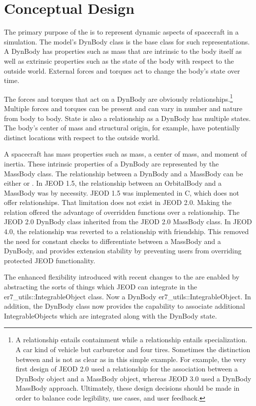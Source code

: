 \section{Conceptual Design}
The primary purpose of the \ModelDesc is to represent dynamic aspects of
spacecraft in a simulation.
The model's DynBody class is the base class for such representations.
A DynBody has properties such as mass that are intrinsic to the body itself
as well as extrinsic properties such as the state of the body with
respect to the outside world. External forces and torques act to change
the body's state over time.

The forces and torques that act on a DynBody are obviously \hasa
relationships.\footnote{A \hasa relationship entails containment while a \isa
relationship entails specialization. A car \isa kind of vehicle but \hasa carburetor and four tires. Sometimes the distinction between \isa and \hasa
is not as clear as in this simple example. For example, the very first design
of JEOD 2.0 used a \hasa relationship for the association between a DynBody
object and a MassBody object, whereas JEOD 3.0 used a DynBody \isa MassBody approach. Ultimately, these design decisions should be made in order to balance code legibility, use cases, and user feedback.}
Multiple forces and torques can be present and can vary in number
and nature from body to body.
State is also a \hasa relationship as a DynBody has multiple states.
The body's center of mass and structural origin, for example, have potentially
distinct locations with respect to the outside world.

A spacecraft has mass properties such as mass, a center of mass, and
moment of inertia.
These intrinsic properties of a DynBody are represented by the
 MassBody class. The relationship
between a DynBody and a MassBody can be either \hasa or \isa.
In JEOD 1.5, the relationship between an OrbitalBody
and a MassBody was \hasa by necessity. JEOD 1.5 was implemented in C,
which does not offer \isa relationships. That limitation does not
exist in JEOD 2.0. Making the relation \isa offered the advantage of overridden
functions over a \hasa relationship. The JEOD 2.0 DynBody class
inherited from the JEOD 2.0 MassBody class. In JEOD 4.0, the relationship was 
reverted to a \hasa relationship with friendship. This removed the need for 
constant checks to differentiate between a MassBody and a DynBody, and provides
 extension stability by preventing users from overriding protected JEOD 
 functionality.

The enhanced flexibility introduced with recent changes to
the  \INTEGRATION are enabled by abstracting the 
sorts of things which JEOD can integrate in the er7\_utils::IntegrableObject
class. Now a DynBody \isa er7\_utils::IntegrableObject.  In addition, the
DynBody class now provides the capability to associate additional
IntegrableObjects which are integrated along with the DynBody state.

